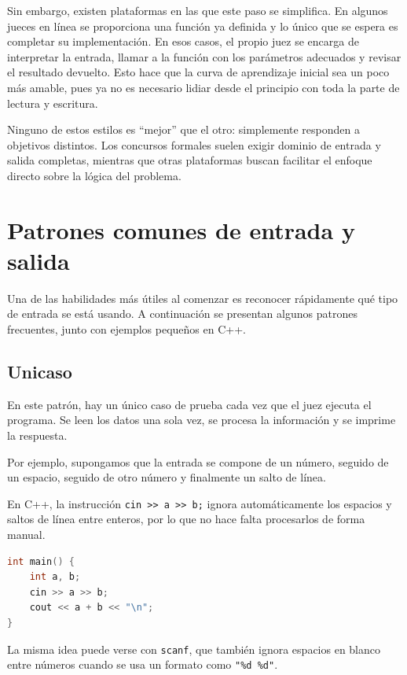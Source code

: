 Sin embargo, existen plataformas en las que este paso se simplifica. En algunos jueces en línea se proporciona una función ya definida y lo único que se espera es completar su implementación. En esos casos, el propio juez se encarga de interpretar la entrada, llamar a la función con los parámetros adecuados y revisar el resultado devuelto. Esto hace que la curva de aprendizaje inicial sea un poco más amable, pues ya no es necesario lidiar desde el principio con toda la parte de lectura y escritura.

Ninguno de estos estilos es ``mejor'' que el otro: simplemente responden a objetivos distintos. Los concursos formales suelen exigir dominio de entrada y salida completas, mientras que otras plataformas buscan facilitar el enfoque directo sobre la lógica del problema.

\section{Patrones comunes de entrada y salida}

Una de las habilidades más útiles al comenzar es reconocer rápidamente qué tipo de entrada se está usando. A continuación se presentan algunos patrones frecuentes, junto con ejemplos pequeños en C++.

\subsection{Unicaso}

En este patrón, hay un único caso de prueba cada vez que el juez ejecuta el programa. Se leen los datos una sola vez, se procesa la información y se imprime la respuesta.

Por ejemplo, supongamos que la entrada se compone de un número, seguido de un espacio, seguido de otro número y finalmente un salto de línea.


En C++, la instrucción \verb|cin >> a >> b;| ignora automáticamente los espacios y saltos de línea entre enteros, por lo que no hace falta procesarlos de forma manual.

\begin{lstlisting}[language=C++]
int main() {
    int a, b;
    cin >> a >> b;
    cout << a + b << "\n";
}
\end{lstlisting}

La misma idea puede verse con \texttt{scanf}, que también ignora espacios en blanco entre números cuando se usa un formato como \texttt{"\%d \%d"}.

